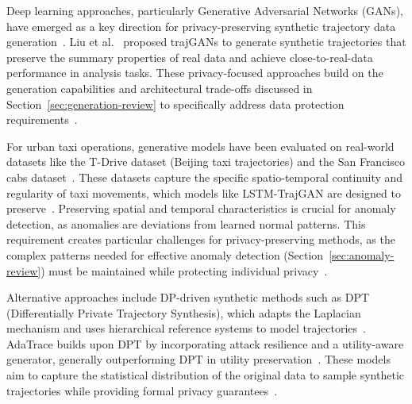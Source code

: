 \documentclass[runningheads]{llncs}
\begin{document}
Deep learning approaches, particularly Generative Adversarial Networks (GANs), have emerged as a key direction for privacy-preserving synthetic trajectory data generation~\cite{buchholzSystematisationKnowledgeTrajectory2024,liuTrajGANsUsingGenerative2018,raoLSTMTrajGANDeepLearning2020a,quGenerativeAdversarialNetworks2020}. Liu et al.~\cite{liuTrajGANsUsingGenerative2018} proposed trajGANs to generate synthetic trajectories that preserve the summary properties of real data and achieve close-to-real-data performance in analysis tasks. These privacy-focused approaches build on the generation capabilities and architectural trade-offs discussed in Section~\ref{sec:generation-review} to specifically address data protection requirements~\cite{raoLSTMTrajGANDeepLearning2020a,quGenerativeAdversarialNetworks2020,buchholzSystematisationKnowledgeTrajectory2024,ponomarevaHowDPfyML2023}.

For urban taxi operations, generative models have been evaluated on real-world datasets like the T-Drive dataset (Beijing taxi trajectories) and the San Francisco cabs dataset~\cite{maTrajectoryPrivacyProtection2021,primaultDifferentiallyPrivateLocation2014,primaultLongRoadComputational2019}. These datasets capture the specific spatio-temporal continuity and regularity of taxi movements, which models like LSTM-TrajGAN are designed to preserve~\cite{raoLSTMTrajGANDeepLearning2020a,liuTrajGANsUsingGenerative2018,jinSurveyExperimentalStudy2023}. Preserving spatial and temporal characteristics is crucial for anomaly detection, as anomalies are deviations from learned normal patterns. This requirement creates particular challenges for privacy-preserving methods, as the complex patterns needed for effective anomaly detection (Section~\ref{sec:anomaly-review}) must be maintained while protecting individual privacy~\cite{raoLSTMTrajGANDeepLearning2020a,naghizadePrivacyContextawareRelease2020}.

Alternative approaches include DP-driven synthetic methods such as DPT (Differentially Private Trajectory Synthesis), which adapts the Laplacian mechanism and uses hierarchical reference systems to model trajectories~\cite{chenDifferentiallyPrivateTrajectory2011,jinSurveyExperimentalStudy2023}. AdaTrace builds upon DPT by incorporating attack resilience and a utility-aware generator, generally outperforming DPT in utility preservation~\cite{jinSurveyExperimentalStudy2023}. These models aim to capture the statistical distribution of the original data to sample synthetic trajectories while providing formal privacy guarantees~\cite{jinSurveyExperimentalStudy2023,quGenerativeAdversarialNetworks2020}.
\end{document}
